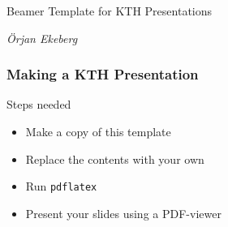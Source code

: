 \documentclass[aspectratio=1610]{beamer}
\begin{document}


\begin{frame}

  \vspace{0.02\textheight}
  
  \begin{Large}
    Beamer Template for KTH Presentations
  \end{Large}

  \vspace{0.1\textheight}

  \begin{small}
    \textit{Örjan Ekeberg}
  \end{small}
\end{frame}




\begin{frame}
  \frametitle{\hfill Making a KTH Presentation}

  \begin{block}{Steps needed}
    \begin{itemize}
    \item Make a copy of this template
    \item Replace the contents with your own
    \item Run \texttt{pdflatex}
    \item Present your slides using a PDF-viewer
    \end{itemize}
  \end{block}

\end{frame}
\end{document}
